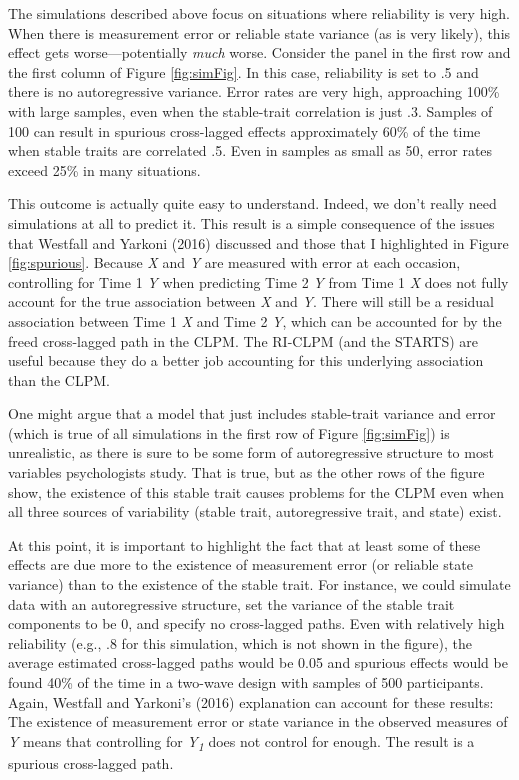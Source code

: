 \documentclass[
  english,
  man,floatsintext]{apa6}
\begin{document}
The simulations described above focus on situations where reliability is very high. When there is measurement error or reliable state variance (as is very likely), this effect gets worse---potentially \emph{much} worse. Consider the panel in the first row and the first column of Figure \ref{fig:simFig}. In this case, reliability is set to .5 and there is no autoregressive variance. Error rates are very high, approaching 100\% with large samples, even when the stable-trait correlation is just .3. Samples of 100 can result in spurious cross-lagged effects approximately 60\% of the time when stable traits are correlated .5. Even in samples as small as 50, error rates exceed 25\% in many situations.

This outcome is actually quite easy to understand. Indeed, we don't really need simulations at all to predict it. This result is a simple consequence of the issues that Westfall and Yarkoni (2016) discussed and those that I highlighted in Figure \ref{fig:spurious}. Because \emph{X} and \emph{Y} are measured with error at each occasion, controlling for Time 1 \emph{Y} when predicting Time 2 \emph{Y} from Time 1 \emph{X} does not fully account for the true association between \emph{X} and \emph{Y}. There will still be a residual association between Time 1 \emph{X} and Time 2 \emph{Y}, which can be accounted for by the freed cross-lagged path in the CLPM. The RI-CLPM (and the STARTS) are useful because they do a better job accounting for this underlying association than the CLPM.

One might argue that a model that just includes stable-trait variance and error (which is true of all simulations in the first row of Figure \ref{fig:simFig}) is unrealistic, as there is sure to be some form of autoregressive structure to most variables psychologists study. That is true, but as the other rows of the figure show, the existence of this stable trait causes problems for the CLPM even when all three sources of variability (stable trait, autoregressive trait, and state) exist.

At this point, it is important to highlight the fact that at least some of these effects are due more to the existence of measurement error (or reliable state variance) than to the existence of the stable trait. For instance, we could simulate data with an autoregressive structure, set the variance of the stable trait components to be 0, and specify no cross-lagged paths. Even with relatively high reliability (e.g., .8 for this simulation, which is not shown in the figure), the average estimated cross-lagged paths would be 0.05 and spurious effects would be found 40\% of the time in a two-wave design with samples of 500 participants. Again, Westfall and Yarkoni's (2016) explanation can account for these results: The existence of measurement error or state variance in the observed measures of \emph{Y} means that controlling for \emph{Y\textsubscript{1}} does not control for enough. The result is a spurious cross-lagged path.
\end{document}
